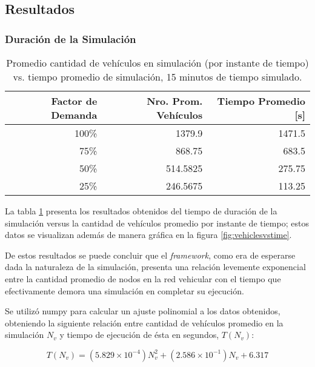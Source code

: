 \subsection{Resultados}

\subsubsection{Duración de la Simulación}

\begin{table}[tpb]
    \centering
    \begin{tabular}{@{}rrr@{}}
        \textbf{Factor de Demanda} & \textbf{Nro. Prom. Vehículos} & \textbf{Tiempo Promedio [s]} \\ \midrule
        100\%           & 1379.9          & 1471.5              \\ %
        75\%            & 868.75          & 683.5               \\ %
        50\%            & 514.5825        & 275.75              \\ %
        25\%            & 246.5675        & 113.25              \\ \bottomrule
    \end{tabular}
    \caption[Cantidad de vehículos vs. tiempo real de simulación]{Promedio cantidad de vehículos en simulación (por instante de tiempo) vs. tiempo promedio de simulación, 15 minutos de tiempo simulado.}
    \label{table:vehiclesvstime}
\end{table}

La tabla \ref{table:vehiclesvstime} presenta los resultados obtenidos del tiempo de duración de la simulación versus la cantidad de vehículos promedio por instante de tiempo; estos datos se visualizan además de manera gráfica en la figura \ref{fig:vehiclesvstime}.

De estos resultados se puede concluir que el \emph{framework}, como era de esperarse dada la naturaleza de la simulación, presenta una relación levemente exponencial entre la cantidad promedio de nodos en la red vehicular con el tiempo que efectivamente demora una simulación en completar su ejecución.

Se utilizó numpy para calcular un ajuste polinomial a los datos obtenidos, obteniendo la siguiente relación entre cantidad de vehículos promedio en la simulación $N_{v}$ y tiempo de ejecución de ésta en segundos, $T(N_{v})$:

\[ T(N_{v}) = (5.829 \times 10^{-4})N_{v}^{2} + (2.586 \times 10^{-1})N_{v} + 6.317 \]

